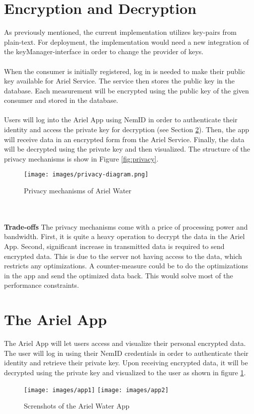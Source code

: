 \section{Encryption and Decryption}
As previously mentioned, the current implementation utilizes key-pairs from plain-text. For deployment, the implementation would need a new integration of the keyManager-interface in order to change the provider of keys.
\\\\
When the consumer is initially registered, log in is needed to make their public key available for Ariel Service. The service then stores the public key in the database. Each measurement will be encrypted using the public key of the given consumer and stored in the database. 
\\\\
Users will log into the Ariel App using NemID in order to authenticate their identity and access the private key for decryption (see Section \ref{sec:app}). Then, the app will receive data in an encrypted form from the Ariel Service. Finally, the data will be decrypted using the private key and then visualized. The structure of the privacy mechanisms is show in Figure \ref{fig:privacy}.
\label{fig:privacy}
\begin{figure}
	\centering
	\texttt{[image: images/privacy-diagram.png]}
	\caption{Privacy mechanisms of Ariel Water}
\end{figure}
\\\\\textbf{Trade-offs}
The privacy mechanisms come with a price of processing power and bandwidth. First, it is quite a heavy operation to decrypt the data in the Ariel App. Second, significant increase in transmitted data is required to send encrypted data. This is due to the server not having access to the data, which restricts any optimizations. A counter-measure could be to do the optimizations in the app and send the optimized data back. This would solve most of the performance constraints.
\section{The Ariel App}
\label{sec:app}
The Ariel App will let users access and visualize their personal encrypted data. The user will log in using their NemID credentials in order to authenticate their identity and retrieve their private key. Upon receiving encrypted data, it will be decrypted using the private key and visualized to the user as shown in figure \ref{fig:app}.
\begin{figure}[H]\label{fig:app}
	\centering
	\texttt{[image: images/app1]} \texttt{[image: images/app2]}
 	\caption{Screnshots of the Ariel Water App}
\end{figure}

